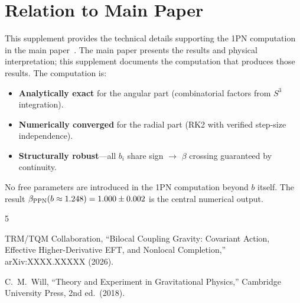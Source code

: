 \documentclass[aps,prd,onecolumn,superscriptaddress]{revtex4-2}
\begin{document}
\section{Relation to Main Paper}
\label{sec:S9}

This supplement provides the technical details supporting the 1PN computation in the main paper~\cite{TRM_V4_Paper}. The main paper presents the results and physical interpretation; this supplement documents the computation that produces those results. The computation is:

\begin{itemize}
\item \textbf{Analytically exact} for the angular part (combinatorial factors from $S^3$ integration).
\item \textbf{Numerically converged} for the radial part (RK2 with verified step-size independence).
\item \textbf{Structurally robust}---all $b_i$ share sign $\to$ $\beta$ crossing guaranteed by continuity.
\end{itemize}

No free parameters are introduced in the 1PN computation beyond $b$ itself. The result $\beta_{\rm PPN}(b \approx 1.248) = 1.000 \pm 0.002$ is the central numerical output.


\begin{thebibliography}{5}

TRM/TQM Collaboration,
``Bilocal Coupling Gravity: Covariant Action, Effective Higher-Derivative EFT, and Nonlocal Completion,''
arXiv:XXXX.XXXXX (2026).

C.~M.~Will,
``Theory and Experiment in Gravitational Physics,''
Cambridge University Press, 2nd ed.\ (2018).

\end{thebibliography}
\end{document}

